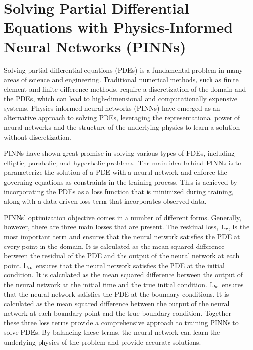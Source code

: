 \documentclass[letterpaper]{article} %
\begin{document}
   \section{Solving Partial Differential Equations with Physics-Informed Neural Networks (PINNs)} \label{app:pdes}

        Solving partial differential equations (PDEs) is a fundamental problem in many areas of science and engineering. Traditional numerical methods, such as finite element and finite difference methods, require a discretization of the domain and the PDEs, which can lead to high-dimensional and computationally expensive systems. Physics-informed neural networks (PINNs) \cite{raissi2017physics2, raissi2019physics, raissi2017physics1, GAO2021110079} have emerged as an alternative approach to solving PDEs, leveraging the representational power of neural networks and the structure of the underlying physics to learn a solution without discretization.

        PINNs have shown great promise in solving various types of PDEs, including elliptic, parabolic, and hyperbolic problems. The main idea behind PINNs is to parameterize the solution of a PDE with a neural network and enforce the governing equations as constraints in the training process. This is achieved by incorporating the PDEs as a loss function that is minimized during training, along with a data-driven loss term that incorporates observed data. 

        PINNs' optimization objective comes in a number of different forms. Generally, however, there are three main losses that are present. 
        The residual loss, $\text{L}_{r}$, is the most important term and ensures that the neural network satisfies the PDE at every point in the domain. It is calculated as the mean squared difference between the residual of the PDE and the output of the neural network at each point. $\text{L}_{ic}$ ensures that the neural network satisfies the PDE at the initial condition. It is calculated as the mean squared difference between the output of the neural network at the initial time and the true initial condition. $\text{L}_{bc}$ ensures that the neural network satisfies the PDE at the boundary conditions. It is calculated as the mean squared difference between the output of the neural network at each boundary point and the true boundary condition. Together, these three loss terms provide a comprehensive approach to training PINNs to solve PDEs. By balancing these terms, the neural network can learn the underlying physics of the problem and provide accurate solutions.
\end{document}
